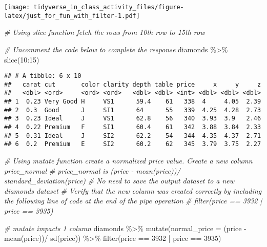 \documentclass[
]{article}
\newenvironment{Shaded}{\begin{snugshade}}{\end{snugshade}}
\newcommand{\AttributeTok}[1]{\textcolor[rgb]{0.77,0.63,0.00}{#1}}
\newcommand{\CommentTok}[1]{\textcolor[rgb]{0.56,0.35,0.01}{\textit{#1}}}
\newcommand{\DecValTok}[1]{\textcolor[rgb]{0.00,0.00,0.81}{#1}}
\newcommand{\FunctionTok}[1]{\textcolor[rgb]{0.00,0.00,0.00}{#1}}
\newcommand{\NormalTok}[1]{#1}
\newcommand{\SpecialCharTok}[1]{\textcolor[rgb]{0.00,0.00,0.00}{#1}}
\begin{document}
\texttt{[image: tidyverse\_in\_class\_activity\_files/figure-latex/just\_for\_fun\_with\_filter-1.pdf]}

\begin{Shaded}
\begin{Highlighting}[]
\CommentTok{\# Using slice function fetch the rows from 10th row to 15th row}

\CommentTok{\# Uncomment the code below to complete the response }
\NormalTok{diamonds }\SpecialCharTok{\%\textgreater{}\%} 
\FunctionTok{slice}\NormalTok{(}\DecValTok{10}\SpecialCharTok{:}\DecValTok{15}\NormalTok{)}
\end{Highlighting}
\end{Shaded}

\begin{verbatim}
## # A tibble: 6 x 10
##   carat cut       color clarity depth table price     x     y     z
##   <dbl> <ord>     <ord> <ord>   <dbl> <dbl> <int> <dbl> <dbl> <dbl>
## 1  0.23 Very Good H     VS1      59.4    61   338  4     4.05  2.39
## 2  0.3  Good      J     SI1      64      55   339  4.25  4.28  2.73
## 3  0.23 Ideal     J     VS1      62.8    56   340  3.93  3.9   2.46
## 4  0.22 Premium   F     SI1      60.4    61   342  3.88  3.84  2.33
## 5  0.31 Ideal     J     SI2      62.2    54   344  4.35  4.37  2.71
## 6  0.2  Premium   E     SI2      60.2    62   345  3.79  3.75  2.27
\end{verbatim}

\begin{Shaded}
\begin{Highlighting}[]
\CommentTok{\# Using mutate function create a normalized price value. Create a new column price\_normal}
\CommentTok{\# price\_normal is (price {-} mean(price))/ standard\_deviation(price)}
\CommentTok{\# No need to save the output dataset to a new diamonds dataset }
\CommentTok{\# Verify that the new column was created correctly by including the following line of code at the end of the pipe operation}
\CommentTok{\# filter(price == 3932 | price == 3935)}

\CommentTok{\# mutate impacts 1 column}
\NormalTok{diamonds }\SpecialCharTok{\%\textgreater{}\%}
  \FunctionTok{mutate}\NormalTok{(}\AttributeTok{normal\_price =}\NormalTok{ (price }\SpecialCharTok{{-}} \FunctionTok{mean}\NormalTok{(price))}\SpecialCharTok{/} \FunctionTok{sd}\NormalTok{(price)) }\SpecialCharTok{\%\textgreater{}\%}
\FunctionTok{filter}\NormalTok{(price }\SpecialCharTok{==} \DecValTok{3932} \SpecialCharTok{|}\NormalTok{ price }\SpecialCharTok{==} \DecValTok{3935}\NormalTok{)}
\end{Highlighting}
\end{Shaded}
\end{document}

